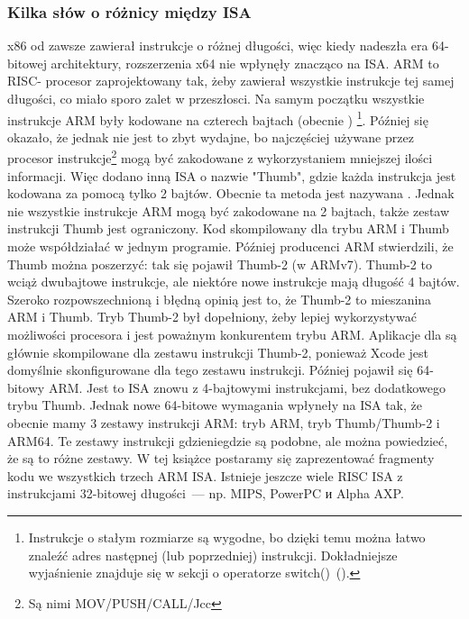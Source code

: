 \subsubsection{Kilka słów o różnicy między \ac{ISA}}
x86 od zawsze  zawierał instrukcje o różnej długości, więc kiedy nadeszła era 64-bitowej architektury, rozszerzenia x64 nie wpłynęły znacząco na \ac{ISA}. 
ARM to \ac{RISC}- procesor zaprojektowany tak, żeby zawierał wszystkie instrukcje tej samej długości, co miało sporo zalet w przeszłosci. Na samym początku wszystkie instrukcje ARM były kodowane na czterech bajtach (obecnie )%
\footnote{
Instrukcje o stałym rozmiarze są wygodne, bo dzięki temu można łatwo znaleźć adres następnej (lub poprzedniej) instrukcji. Dokładniejsze wyjaśnienie znajduje się w sekcji o operatorze switch()~().
}.
Później się okazało, że jednak nie jest to zbyt wydajne, bo najczęściej używane przez procesor instrukcje\footnote{Są nimi MOV/PUSH/CALL/Jcc} mogą być zakodowane z wykorzystaniem mniejszej ilości informacji. Więc dodano inną \ac{ISA} o nazwie "Thumb", gdzie każda instrukcja jest kodowana za pomocą tylko 2 bajtów. Obecnie ta metoda jest nazywana .
Jednak nie wszystkie instrukcje ARM mogą być zakodowane na 2 bajtach, także zestaw instrukcji Thumb jest ograniczony. Kod skompilowany dla trybu ARM i Thumb może współdziałać w jednym programie. Później producenci ARM stwierdzili, że Thumb można poszerzyć: tak się pojawił Thumb-2 (w ARMv7). Thumb-2 to wciąż dwubajtowe instrukcje, ale niektóre nowe instrukcje mają długość 4 bajtów. Szeroko rozpowszechnioną i błędną opinią jest to, że Thumb-2 to mieszanina ARM i Thumb. Tryb Thumb-2 był dopełniony, żeby lepiej wykorzystywać możliwości procesora i jest poważnym konkurentem trybu ARM. Aplikacje dla \idevices są głównie skompilowane dla zestawu instrukcji Thumb-2, ponieważ Xcode jest domyślnie skonfigurowane dla tego zestawu instrukcji. Później pojawił się 64-bitowy ARM. Jest to \ac{ISA} znowu z 4-bajtowymi instrukcjami, bez dodatkowego trybu Thumb. Jednak nowe 64-bitowe wymagania wpłyneły na \ac{ISA} tak, że obecnie mamy 3 zestawy instrukcji ARM: tryb ARM, tryb Thumb/Thumb-2 i ARM64. Te zestawy instrukcji gdzieniegdzie są podobne, ale można powiedzieć, że są to różne zestawy. W tej książce postaramy się zaprezentować fragmenty kodu we wszystkich trzech ARM  \ac{ISA}.
%
%
%
Istnieje jeszcze wiele \ac{RISC} \ac{ISA} z instrukcjami 32-bitowej długości~--- np. MIPS, PowerPC и Alpha AXP.

